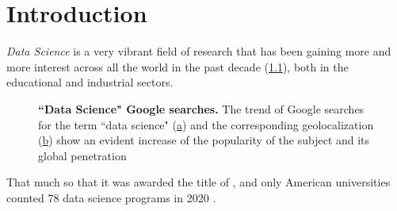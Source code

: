 \chapter{Introduction}
\label{chap:introduction}


\textit{Data Science} is a very vibrant field of research that has been gaining more and more interest across all the world in the past decade (\cref{fig:GoogleTrendsDS}), both in the educational and industrial sectors.
\begin{figure}
\centering
{}

\caption{
\textbf{``Data Science" Google searches.} The trend of Google searches for the term ``data science" (\hyperref[fig:GoogleTrendsDS:ts]{a}) and the corresponding geolocalization (\hyperref[fig:GoogleTrendsDS:map]{b}) show an evident increase of the popularity of the subject and its global penetration
} 
\label{fig:GoogleTrendsDS}
\end{figure}
That much so that it was awarded the title of  \cite{davenport2012sexiest}, and only American universities counted 78 data science programs in 2020 \cite{zhang2021data}.

